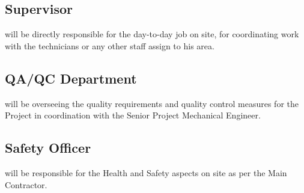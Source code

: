 \subsection{Supervisor}  will be directly responsible for the day-to-day job on site, for coordinating work with the technicians or any other staff assign to his area.

\subsection{QA/QC Department}  will be overseeing the quality requirements and quality control measures for the Project in coordination with the Senior Project Mechanical Engineer.

\subsection{Safety Officer}  will be responsible for the Health and Safety aspects on site as per the Main Contractor. 

